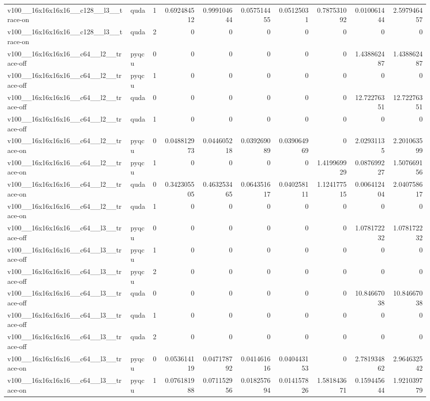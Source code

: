 \begin{table}[htbp]
\begin{tabular}{@{}llrrrrrrrr@{}}
v100\_\_16x16x16x16\_\_c128\_\_l3\_\_trace-on & quda & 1 & 0.692484512 & 0.999104644 & 0.057514455 & 0.05125031 & 0.787531092 & 0.010061444 & 2.597946457 \\
v100\_\_16x16x16x16\_\_c128\_\_l3\_\_trace-on & quda & 2 & 0 & 0 & 0 & 0 & 0 & 0 & 0 \\
v100\_\_16x16x16x16\_\_c64\_\_l2\_\_trace-off & pyqcu & 0 & 0 & 0 & 0 & 0 & 0 & 1.438862487 & 1.438862487 \\
v100\_\_16x16x16x16\_\_c64\_\_l2\_\_trace-off & pyqcu & 1 & 0 & 0 & 0 & 0 & 0 & 0 & 0 \\
v100\_\_16x16x16x16\_\_c64\_\_l2\_\_trace-off & quda & 0 & 0 & 0 & 0 & 0 & 0 & 12.72276351 & 12.72276351 \\
v100\_\_16x16x16x16\_\_c64\_\_l2\_\_trace-off & quda & 1 & 0 & 0 & 0 & 0 & 0 & 0 & 0 \\
v100\_\_16x16x16x16\_\_c64\_\_l2\_\_trace-on & pyqcu & 0 & 0.048812973 & 0.044605218 & 0.039269089 & 0.039064969 & 0 & 2.02931135 & 2.201063599 \\
v100\_\_16x16x16x16\_\_c64\_\_l2\_\_trace-on & pyqcu & 1 & 0 & 0 & 0 & 0 & 1.419969929 & 0.087699227 & 1.507669156 \\
v100\_\_16x16x16x16\_\_c64\_\_l2\_\_trace-on & quda & 0 & 0.342305505 & 0.463253465 & 0.064351617 & 0.040258111 & 1.124177515 & 0.006412404 & 2.040758617 \\
v100\_\_16x16x16x16\_\_c64\_\_l2\_\_trace-on & quda & 1 & 0 & 0 & 0 & 0 & 0 & 0 & 0 \\
v100\_\_16x16x16x16\_\_c64\_\_l3\_\_trace-off & pyqcu & 0 & 0 & 0 & 0 & 0 & 0 & 1.078172232 & 1.078172232 \\
v100\_\_16x16x16x16\_\_c64\_\_l3\_\_trace-off & pyqcu & 1 & 0 & 0 & 0 & 0 & 0 & 0 & 0 \\
v100\_\_16x16x16x16\_\_c64\_\_l3\_\_trace-off & pyqcu & 2 & 0 & 0 & 0 & 0 & 0 & 0 & 0 \\
v100\_\_16x16x16x16\_\_c64\_\_l3\_\_trace-off & quda & 0 & 0 & 0 & 0 & 0 & 0 & 10.84667038 & 10.84667038 \\
v100\_\_16x16x16x16\_\_c64\_\_l3\_\_trace-off & quda & 1 & 0 & 0 & 0 & 0 & 0 & 0 & 0 \\
v100\_\_16x16x16x16\_\_c64\_\_l3\_\_trace-off & quda & 2 & 0 & 0 & 0 & 0 & 0 & 0 & 0 \\
v100\_\_16x16x16x16\_\_c64\_\_l3\_\_trace-on & pyqcu & 0 & 0.053614119 & 0.047178792 & 0.041461616 & 0.040443153 & 0 & 2.781934862 & 2.964632542 \\
v100\_\_16x16x16x16\_\_c64\_\_l3\_\_trace-on & pyqcu & 1 & 0.076181988 & 0.071152956 & 0.018257694 & 0.014157826 & 1.581843671 & 0.159445644 & 1.921039779 \\

\end{tabular}
\end{table}
